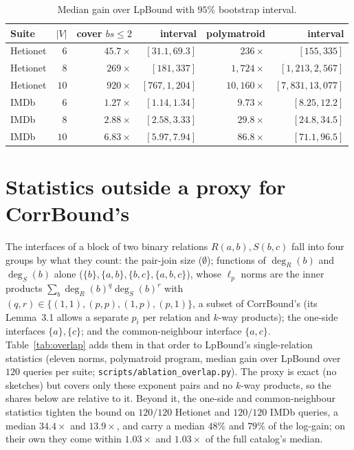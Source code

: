 \documentclass[11pt]{article}
\begin{document}
\begin{table}[h]
\centering
\caption{Median gain over LpBound with $95\%$ bootstrap interval.}
\label{tab:boot}
\small\setlength{\tabcolsep}{3pt}
\begin{tabular}{@{}lrrrrr@{}}
\toprule
Suite & $|V|$ & cover $bs{\le}2$ & interval & polymatroid & interval \\
\midrule
Hetionet & $6$ & $45.7\times$ & $[31.1, 69.3]$ & $236\times$ & $[155, 335]$ \\
Hetionet & $8$ & $269\times$ & $[181, 337]$ & $1{,}724\times$ & $[1{,}213, 2{,}567]$ \\
Hetionet & $10$ & $920\times$ & $[767, 1{,}204]$ & $10{,}160\times$ & $[7{,}831, 13{,}077]$ \\
IMDb & $6$ & $1.27\times$ & $[1.14, 1.34]$ & $9.73\times$ & $[8.25, 12.2]$ \\
IMDb & $8$ & $2.88\times$ & $[2.58, 3.33]$ & $29.8\times$ & $[24.8, 34.5]$ \\
IMDb & $10$ & $6.83\times$ & $[5.97, 7.94]$ & $86.8\times$ & $[71.1, 96.5]$ \\
\bottomrule
\end{tabular}
\end{table}

\section{Statistics outside a proxy for CorrBound's}
The interfaces of a block of two binary relations $R(a,b),S(b,c)$ fall into
four groups by what they count: the pair-join size ($\emptyset$); functions
of $\deg_R(b)$ and $\deg_S(b)$ alone ($\{b\},\{a,b\},\{b,c\},\{a,b,c\}$),
whose $\ell_p$ norms are the inner products
$\sum_b\deg_R(b)^q\deg_S(b)^r$ with $(q,r)\in\{(1,1),(p,p),(1,p),(p,1)\}$, a subset of CorrBound's (its Lemma~3.1 allows a separate $p_i$ per relation and $k$-way products); the one-side
interfaces $\{a\},\{c\}$; and the common-neighbour interface $\{a,c\}$.
Table~\ref{tab:overlap} adds them in that order to LpBound's single-relation
statistics (eleven norms, polymatroid program, median gain over LpBound over
$120$ queries per suite; \texttt{scripts/ablation\_overlap.py}). The proxy is
exact (no sketches) but covers only these exponent pairs and no $k$-way
products, so the shares below are relative to it. Beyond it, the one-side and
common-neighbour statistics tighten the bound on $120/120$ Hetionet and
$120/120$ IMDb queries, a median $34.4\times$ and $13.9\times$, and carry a median
$48\%$ and $79\%$ of the log-gain; on their own they come within
$1.03\times$ and $1.03\times$ of the full catalog's median.
\end{document}
